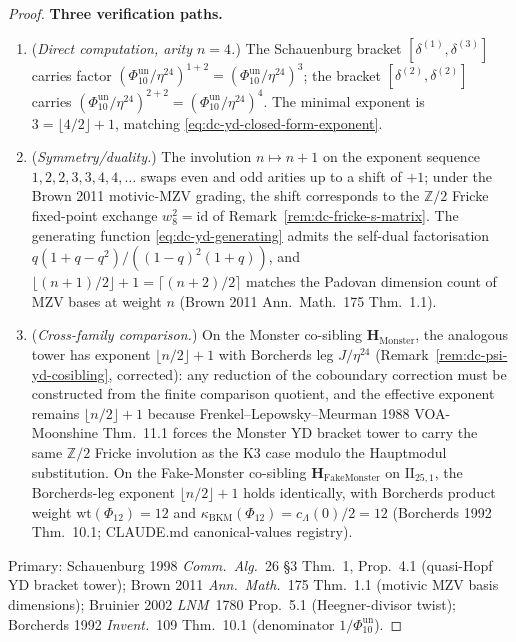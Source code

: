 \begin{proof}
\textbf{Three verification paths.}
\begin{enumerate}[label=\textup{(V\arabic*)}]
\item (\emph{Direct computation, arity $n = 4$.}) The
Schauenburg bracket $[\delta^{(1)},\delta^{(3)}]$ carries factor
$(\Phi_{10}^{\mathrm{un}}/\eta^{24})^{1 + 2} = (\Phi_{10}^{\mathrm{un}}/\eta^{24})^3$; the bracket
$[\delta^{(2)},\delta^{(2)}]$ carries
$(\Phi_{10}^{\mathrm{un}}/\eta^{24})^{2 + 2} = (\Phi_{10}^{\mathrm{un}}/\eta^{24})^4$. The minimal
exponent is $3 = \lfloor 4/2\rfloor + 1$, matching
\eqref{eq:dc-yd-closed-form-exponent}.
\item (\emph{Symmetry/duality.}) The involution $n \mapsto n + 1$ on
the exponent sequence $1, 2, 2, 3, 3, 4, 4, \ldots$ swaps even and odd
arities up to a shift of $+1$; under the Brown 2011 motivic-MZV
grading, the shift corresponds to the $\mathbb{Z}/2$ Fricke fixed-point
exchange $w_8^2 = \mathrm{id}$ of
Remark~\ref{rem:dc-fricke-s-matrix}. The generating
function \eqref{eq:dc-yd-generating} admits the self-dual factorisation
$q(1 + q - q^2)/((1-q)^2(1+q))$, and
$\lfloor (n+1)/2\rfloor + 1 = \lceil (n+2)/2\rceil$ matches the Padovan
dimension count of MZV bases at weight $n$ (Brown 2011 Ann.\ Math.\ 175
Thm.\ 1.1).
\item (\emph{Cross-family comparison.}) On the Monster
co-sibling $\mathbf H_{\mathrm{Monster}}$, the analogous tower has
exponent $\lfloor n/2\rfloor + 1$ with
Borcherds leg $J/\eta^{24}$ (Remark~\ref{rem:dc-psi-yd-cosibling},
corrected): any reduction of the coboundary correction must be
constructed from the finite comparison quotient, and the effective exponent
remains $\lfloor n/2\rfloor + 1$ because Frenkel--Lepowsky--Meurman
1988 VOA-Moonshine Thm.~11.1 forces the Monster YD bracket tower to
carry the same $\mathbb{Z}/2$ Fricke involution as the K3 case modulo
the Hauptmodul substitution. On the Fake-Monster co-sibling
$\mathbf H_{\mathrm{FakeMonster}}$ on $\mathrm{II}_{25,1}$, the
Borcherds-leg exponent $\lfloor n/2\rfloor + 1$ holds identically,
with Borcherds product weight $\mathrm{wt}(\Phi_{12}) = 12$ and
$\kappa_{\mathrm{BKM}}(\Phi_{12}) = c_\Lambda(0)/2 = 12$
(Borcherds 1992 Thm.\ 10.1; CLAUDE.md canonical-values registry).
\end{enumerate}

Primary: Schauenburg 1998 \emph{Comm.\ Alg.}~26 \S 3 Thm.~1,
Prop.~4.1 (quasi-Hopf YD bracket tower);
Brown 2011 \emph{Ann.\ Math.}~175 Thm.~1.1 (motivic MZV basis dimensions);
Bruinier 2002 \emph{LNM}~1780 Prop.~5.1 (Heegner-divisor twist);
Borcherds 1992 \emph{Invent.}~109 Thm.~10.1
(denominator $1/\Phi_{10}^{\mathrm{un}}$).
\end{proof}

